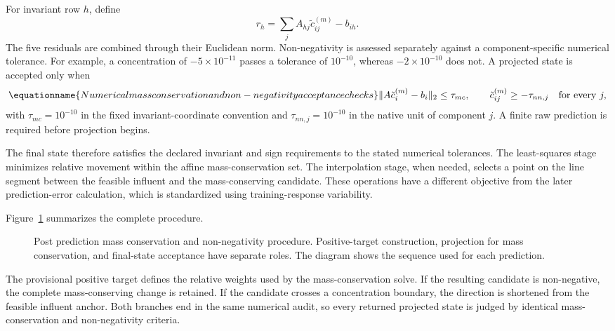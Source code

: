 For invariant row $h$, define
\[
r_h=\sum_jA_{hj}\tilde c_{ij}^{(m)}-b_{ih}.
\]
The five residuals are combined through their Euclidean norm. Non-negativity is assessed separately against a component-specific numerical tolerance. For example, a concentration of $-5\times10^{-11}$ passes a tolerance of $10^{-10}$, whereas $-2\times10^{-10}$ does not. A projected state is accepted only when
\begin{equation}
\equationname{Numerical mass conservation and non-negativity acceptance checks}
\|A\tilde c_i^{(m)}-b_i\|_2\leq\tau_{mc},\qquad
\tilde c_{ij}^{(m)}\geq-\tau_{nn,j}\quad\text{for every }j,
\label{eq:projection_numerical_acceptance}
\end{equation}
with $\tau_{mc}=10^{-10}$ in the fixed invariant-coordinate convention and
$\tau_{nn,j}=10^{-10}$ in the native unit of component $j$. A finite raw prediction is required before projection begins.

The final state therefore satisfies the declared invariant and sign requirements to the stated numerical tolerances. The least-squares stage minimizes relative movement within the affine mass-conservation set. The interpolation stage, when needed, selects a point on the line segment between the feasible influent and the mass-conserving candidate. These operations have a different objective from the later prediction-error calculation, which is standardized using training-response variability.

Figure~\ref{fig:projection_acceptance_flow} summarizes the complete procedure.

\begin{figure}[htbp]
\centering

\caption{Post prediction mass conservation and non-negativity procedure. Positive-target construction, projection for mass conservation, and final-state acceptance have separate roles. The diagram shows the sequence used for each prediction.}
\label{fig:projection_acceptance_flow}
\end{figure}

The provisional positive target defines the relative weights used by the mass-conservation solve. If the resulting candidate is non-negative, the complete mass-conserving change is retained. If the candidate crosses a concentration boundary, the direction is shortened from the feasible influent anchor. Both branches end in the same numerical audit, so every returned projected state is judged by identical mass-conservation and non-negativity criteria.

